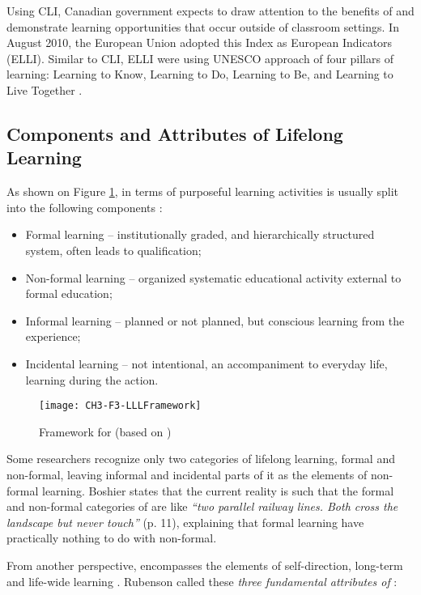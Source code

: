 Using CLI, Canadian government expects to draw attention to the benefits of
\LLLs and demonstrate learning opportunities that occur outside of classroom
settings. In August 2010, the European Union adopted this Index as European
\LLLc Indicators (ELLI). Similar to CLI, ELLI were using UNESCO approach of four
pillars of learning: Learning to Know, Learning to Do, Learning to Be, and
Learning to Live Together \citep{ELLIDevelopmentTeam2010}.

\FloatBarrier

\subsection{Components and Attributes of Lifelong Learning}
As shown on Figure \ref{fig:lllfmwrk}, in terms of purposeful learning
activities \LLLs is usually split into the following components
\citep{Longworth2003, Tuijnman2002}:

\begin{itemize}
  \item Formal learning -- institutionally graded, and hierarchically structured
system, often leads to qualification;
  \item Non-formal learning -- organized systematic educational activity
  external to formal education;
  \item Informal learning -- planned or not planned, but conscious learning from
the experience;
  \item Incidental learning -- not intentional, an accompaniment to everyday
  life, learning during the action.
\end{itemize} 

\begin{figure}[htb]
\centering
\texttt{[image: CH3-F3-LLLFramework]}
\caption[Framework for \LLLc]{Framework for \LLLc (based on
\citealp[p.~11]{Divjak2004})}
\label{fig:lllfmwrk}
\end{figure}

Some researchers \citep{Longworth2003} recognize only two categories of lifelong
learning, formal and non-formal, leaving informal and incidental parts of it as
the elements of non-formal learning. Boshier \citeyearpar{Boshier2000} states
that the current reality is such that the formal and non-formal categories of
\LLLs are like \textit{``two parallel railway lines. Both cross the landscape but
never touch''} (p. 11), explaining that formal learning have practically nothing
to do with non-formal.

From another perspective, \LLLs encompasses the elements of self-direction,
long-term and life-wide learning \citep{Schuetze2006}. Rubenson
\citeyearpar{Rubenson2002} called these \textit{three fundamental attributes of
\LLLs}:

